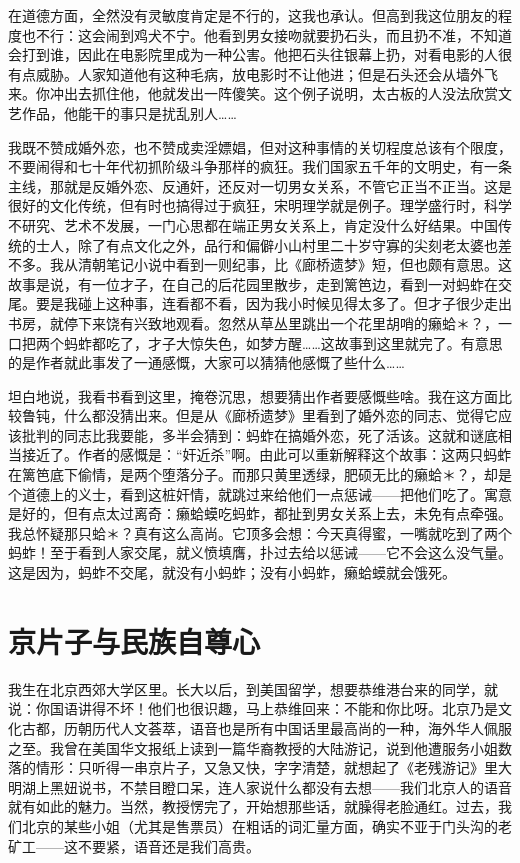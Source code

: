 在道德方面，全然没有灵敏度肯定是不行的，这我也承认。但高到我这位朋友的程度也不行：这会闹到鸡犬不宁。他看到男女接吻就要扔石头，而且扔不准，不知道会打到谁，因此在电影院里成为一种公害。他把石头往银幕上扔，对看电影的人很有点威胁。人家知道他有这种毛病，放电影时不让他进；但是石头还会从墙外飞来。你冲出去抓住他，他就发出一阵傻笑。这个例子说明，太古板的人没法欣赏文艺作品，他能干的事只是扰乱别人…… 

我既不赞成婚外恋，也不赞成卖淫嫖娼，但对这种事情的关切程度总该有个限度，不要闹得和七十年代初抓阶级斗争那样的疯狂。我们国家五千年的文明史，有一条主线，那就是反婚外恋、反通奸，还反对一切男女关系，不管它正当不正当。这是很好的文化传统，但有时也搞得过于疯狂，宋明理学就是例子。理学盛行时，科学不研究、艺术不发展，一门心思都在端正男女关系上，肯定没什么好结果。中国传统的士人，除了有点文化之外，品行和偏僻小山村里二十岁守寡的尖刻老太婆也差不多。我从清朝笔记小说中看到一则纪事，比《廊桥遗梦》短，但也颇有意思。这故事是说，有一位才子，在自己的后花园里散步，走到篱笆边，看到一对蚂蚱在交尾。要是我碰上这种事，连看都不看，因为我小时候见得太多了。但才子很少走出书房，就停下来饶有兴致地观看。忽然从草丛里跳出一个花里胡哨的癞蛤＊？，一口把两个蚂蚱都吃了，才子大惊失色，如梦方醒……这故事到这里就完了。有意思的是作者就此事发了一通感慨，大家可以猜猜他感慨了些什么…… 

坦白地说，我看书看到这里，掩卷沉思，想要猜出作者要感慨些啥。我在这方面比较鲁钝，什么都没猜出来。但是从《廊桥遗梦》里看到了婚外恋的同志、觉得它应该批判的同志比我要能，多半会猜到：蚂蚱在搞婚外恋，死了活该。这就和谜底相当接近了。作者的感慨是：“奸近杀”啊。由此可以重新解释这个故事：这两只蚂蚱在篱笆底下偷情，是两个堕落分子。而那只黄里透绿，肥硕无比的癞蛤＊？，却是个道德上的义士，看到这桩奸情，就跳过来给他们一点惩诫——把他们吃了。寓意是好的，但有点太过离奇：癞蛤蟆吃蚂蚱，都扯到男女关系上去，未免有点牵强。我总怀疑那只蛤＊？真有这么高尚。它顶多会想：今天真得蜜，一嘴就吃到了两个蚂蚱！至于看到人家交尾，就义愤填膺，扑过去给以惩诫——它不会这么没气量。这是因为，蚂蚱不交尾，就没有小蚂蚱；没有小蚂蚱，癞蛤蟆就会饿死。

\chapter{京片子与民族自尊心}

我生在北京西郊大学区里。长大以后，到美国留学，想要恭维港台来的同学，就说：你国语讲得不坏！他们也很识趣，马上恭维回来：不能和你比呀。北京乃是文化古都，历朝历代人文荟萃，语音也是所有中国话里最高尚的一种，海外华人佩服之至。我曾在美国华文报纸上读到一篇华裔教授的大陆游记，说到他遭服务小姐数落的情形：只听得一串京片子，又急又快，字字清楚，就想起了《老残游记》里大明湖上黑妞说书，不禁目瞪口呆，连人家说什么都没有去想——我们北京人的语音就有如此的魅力。当然，教授愣完了，开始想那些话，就臊得老脸通红。过去，我们北京的某些小姐（尤其是售票员）在粗话的词汇量方面，确实不亚于门头沟的老矿工——这不要紧，语音还是我们高贵。 

